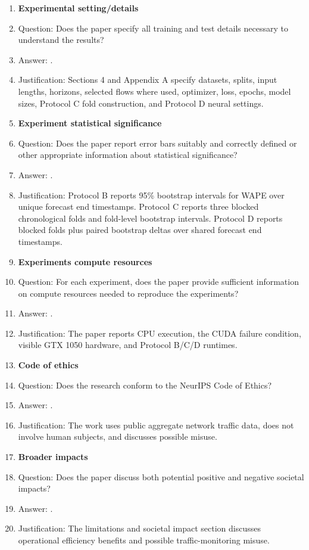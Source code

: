 \documentclass{article}
\begin{document}
\begin{enumerate}
\item {\bf Experimental setting/details}
    \item[] Question: Does the paper specify all training and test details necessary to understand the results?
    \item[] Answer: \answerYes{}.
    \item[] Justification: Sections 4 and Appendix A specify datasets, splits, input lengths, horizons, selected flows where used, optimizer, loss, epochs, model sizes, Protocol C fold construction, and Protocol D neural settings.

\item {\bf Experiment statistical significance}
    \item[] Question: Does the paper report error bars suitably and correctly defined or other appropriate information about statistical significance?
    \item[] Answer: \answerYes{}.
    \item[] Justification: Protocol B reports 95\% bootstrap intervals for WAPE over unique forecast end timestamps. Protocol C reports three blocked chronological folds and fold-level bootstrap intervals. Protocol D reports blocked folds plus paired bootstrap deltas over shared forecast end timestamps.

\item {\bf Experiments compute resources}
    \item[] Question: For each experiment, does the paper provide sufficient information on compute resources needed to reproduce the experiments?
    \item[] Answer: \answerYes{}.
    \item[] Justification: The paper reports CPU execution, the CUDA failure condition, visible GTX 1050 hardware, and Protocol B/C/D runtimes.

\item {\bf Code of ethics}
    \item[] Question: Does the research conform to the NeurIPS Code of Ethics?
    \item[] Answer: \answerYes{}.
    \item[] Justification: The work uses public aggregate network traffic data, does not involve human subjects, and discusses possible misuse.

\item {\bf Broader impacts}
    \item[] Question: Does the paper discuss both potential positive and negative societal impacts?
    \item[] Answer: \answerYes{}.
    \item[] Justification: The limitations and societal impact section discusses operational efficiency benefits and possible traffic-monitoring misuse.


\end{enumerate}
\end{document}
